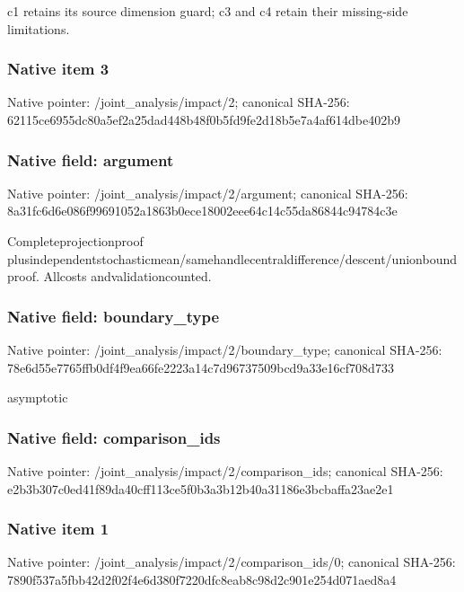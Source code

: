\documentclass[10pt,a4paper]{article}
\begin{document}
\begingroup\raggedright\sloppy c1 retains its source dimension guard;\allowbreak{} c3 and c4 retain their missing-side limitations.\par\endgroup

\subsubsection{Native item 3}
Native pointer: /joint\_\allowbreak{}analysis/impact/2; canonical SHA-256: 62115ce6955dc80a5ef2a25dad448b48f0b5fd9fe2d18b5e7a4af614dbe402b9

\subsubsection{Native field: argument}
Native pointer: /joint\_\allowbreak{}analysis/impact/2/argument; canonical SHA-256: 8a31fc6d6e086f99691052a1863b0ece18002eee64c14c55da86844c94784c3e

\begingroup\raggedright\sloppy Completeprojectionproof plusindependentstochasticmean/\allowbreak{}samehandlecentraldifference/\allowbreak{}descent/\allowbreak{}unionboundproof. Allcosts andvalidationcounted.\par\endgroup

\subsubsection{Native field: boundary\_\allowbreak{}type}
Native pointer: /joint\_\allowbreak{}analysis/impact/2/boundary\_\allowbreak{}type; canonical SHA-256: 78e6d55e7765ffb0df4f9ea66fe2223a14c7d96737509bcd9a33e16cf708d733

\begingroup\raggedright\sloppy asymptotic\par\endgroup

\subsubsection{Native field: comparison\_\allowbreak{}ids}
Native pointer: /joint\_\allowbreak{}analysis/impact/2/comparison\_\allowbreak{}ids; canonical SHA-256: e2b3b307c0ed41f89da40cff113ce5f0b3a3b12b40a31186e3bcbaffa23ae2e1

\subsubsection{Native item 1}
Native pointer: /joint\_\allowbreak{}analysis/impact/2/comparison\_\allowbreak{}ids/0; canonical SHA-256: 7890f537a5fbb42d2f02f4e6d380f7220dfc8eab8c98d2c901e254d071aed8a4
\end{document}
